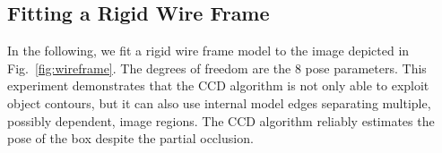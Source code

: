 

\subsection{Fitting a Rigid Wire Frame}
\label{sec:fdo}
In the following, we fit a rigid wire frame model to the image
depicted in Fig.~\ref{fig:wireframe}.  The degrees of freedom
are the 8 pose parameters. This experiment demonstrates that the CCD
algorithm is not only able to exploit object contours, but it can also
use internal model edges separating multiple, possibly dependent,
image regions.  The CCD algorithm reliably estimates the pose of the box despite
the partial occlusion.

\begin{figure}[htbp] 
  \begin{minipage}[t]{0.5\linewidth} 
    \centering  
  \end{minipage}%
  \begin{minipage}[t]{0.5\linewidth} 
    \centering 
  \end{minipage} 
  \begin{minipage}[t]{0.5\linewidth} 
    \centering 

\end{minipage}
\end{figure}
